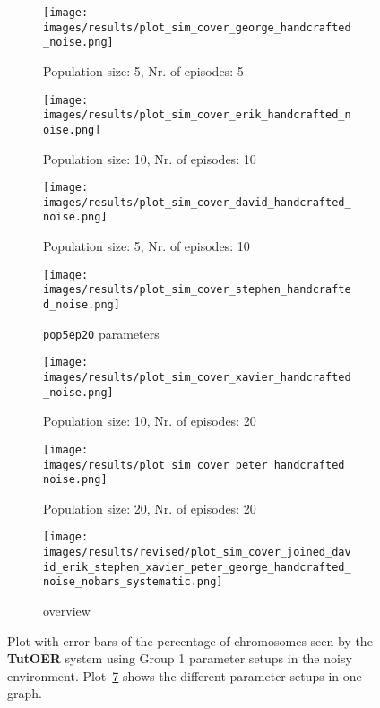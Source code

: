 \begin{figure}[ht]
	\begin{subfigure}{0.48\linewidth}
	\texttt{[image: images/results/plot\_sim\_cover\_george\_handcrafted\_noise.png]}
	\caption{Population size: 5, Nr. of episodes: 5}
	\label{fig:cover_handcrafted_noise_george}
	\end{subfigure}
	\hfill
	\begin{subfigure}{0.48\linewidth}
	\texttt{[image: images/results/plot\_sim\_cover\_erik\_handcrafted\_noise.png]}
	\caption{Population size: 10, Nr. of episodes: 10}
	\label{fig:cover_handcrafted_noise_erik}
	\end{subfigure}
	\begin{subfigure}{0.48\linewidth}
	\texttt{[image: images/results/plot\_sim\_cover\_david\_handcrafted\_noise.png]}
	\caption{Population size: 5, Nr. of episodes: 10}
	\label{fig:cover_handcrafted_noise_david}
	\end{subfigure}
	\hfill
	\begin{subfigure}{0.48\linewidth}
	\texttt{[image: images/results/plot\_sim\_cover\_stephen\_handcrafted\_noise.png]}
	\caption{\texttt{pop5ep20} parameters}
	\label{fig:cover_handcrafted_noise_stephen}
	\end{subfigure}
	\begin{subfigure}{0.48\linewidth}
	\texttt{[image: images/results/plot\_sim\_cover\_xavier\_handcrafted\_noise.png]}
	\caption{Population size: 10, Nr. of episodes: 20}
	\label{fig:cover_handcrafted_noise_xavier}
	\end{subfigure}
	\hfill
	\begin{subfigure}{0.48\linewidth}
	\texttt{[image: images/results/plot\_sim\_cover\_peter\_handcrafted\_noise.png]}
	\caption{Population size: 20, Nr. of episodes: 20}
	\label{fig:cover_handcrafted_noise_peter}
	\end{subfigure}
	\begin{subfigure}{\linewidth}
	\texttt{[image: images/results/revised/plot\_sim\_cover\_joined\_david\_erik\_stephen\_xavier\_peter\_george\_handcrafted\_noise\_nobars\_systematic.png]}
	\caption{overview}
	\label{fig:cover_handcrafted_noise_overview_group1}
	\end{subfigure}
	\caption[Percentage of chromosomes seen in noisy simulated environment for
	group 1]{Plot with error bars of the percentage of chromosomes seen by the \textbf{TutOER}
	system using Group 1 parameter setups in the noisy environment.
	Plot~\ref{fig:cover_handcrafted_noise_overview_group1} shows the
	different parameter setups in one graph.}
	\label{fig:cover_handcrafted_noise_container_group1}
\end{figure}

